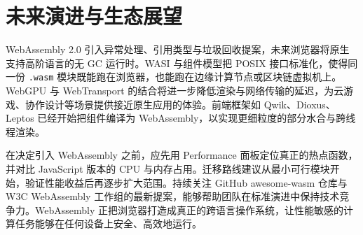 \chapter{未来演进与生态展望}
WebAssembly 2.0 引入异常处理、引用类型与垃圾回收提案，未来浏览器将原生支持高阶语言的无 GC 运行时。WASI 与组件模型把 POSIX 接口标准化，使得同一份 \texttt{.wasm} 模块既能跑在浏览器，也能跑在边缘计算节点或区块链虚拟机上。WebGPU 与 WebTransport 的结合将进一步降低渲染与网络传输的延迟，为云游戏、协作设计等场景提供接近原生应用的体验。前端框架如 Qwik、Dioxus、Leptos 已经开始把组件编译为 WebAssembly，以实现更细粒度的部分水合与跨线程渲染。\par
在决定引入 WebAssembly 之前，应先用 Performance 面板定位真正的热点函数，并对比 JavaScript 版本的 CPU 与内存占用。迁移路线建议从最小可行模块开始，验证性能收益后再逐步扩大范围。持续关注 GitHub awesome-wasm 仓库与 W3C WebAssembly 工作组的最新提案，能够帮助团队在标准演进中保持技术竞争力。WebAssembly 正把浏览器打造成真正的跨语言操作系统，让性能敏感的计算任务能够在任何设备上安全、高效地运行。\par
